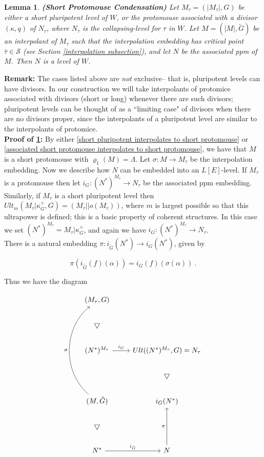 \documentclass[12pt]{article}
\newtheorem{lem}[thm]{Lemma}
\begin{document}
\begin{lem} \label{short protomouse condensation}
\textbf{(Short Protomouse Condensation)}
Let $M_\tau = (| M_\tau | , G)$ be either a short pluripotent level of $W$, or the protomouse associated with a divisor $(\kappa , q)$ of $N_\tau$, where $N_\tau$ is the collapsing-level for $\tau$ in $W$.  Let $M = (|M | , \tilde{G})$ be an interpolant of $M_\tau $ such that the interpolation embedding has critical point $\bar{\tau} \in \mathcal{S}$ (see Section \ref{interpolation subsection}), and let $N$ be the associated ppm of $M$.  Then $N$ is a level of $W$.
\end{lem}

\textbf{Remark:} The cases listed above are \textit{not} exclusive-- that is, pluripotent levels can have divisors.  In our construction we will take interpolants of protomice associated with divisors (short or long) whenever there are such divisors; pluripotent levels can be thought of as a ``limiting case"  of divisors when there are no divisors proper, since the interpolants of a pluripotent level are similar to the interpolants of protomice.\\


\indent \indent \textbf{Proof of \ref{short protomouse condensation}:}  By either \ref{short pluripotent interpolates to short protomouse} or \ref{associated short protomouse interpolates to short protomouse}, we have that $M$ is a short protomouse with $\varrho_{1}(M) = \Lambda$.  Let $\sigma: M \longrightarrow M_\tau$ be the interpolation embedding.  Now we describe how $N$ can be embedded into an $L[E]$-level.  If $M_\tau$ is a protomouse then let $i_G : (N^*)^{M_\tau} \longrightarrow N_\tau$ be the associated ppm embedding.  Similarly, if $M_\tau$ is a short pluripotent level then $Ult_m (M_\tau | \kappa_G^+ , G) = ( M_\tau || o(M_\tau) )$, where $m$ is largest possible so that this ultrapower is defined; this is a basic property of coherent structures.  In this case we set $(N^*)^{M_\tau} = M_\tau | \kappa_G^+$, and again we have $i_G : (N^*)^{M_\tau} \longrightarrow N_\tau$.\\

There is a natural embedding $\pi: i_{\tilde{G}}(N^* ) \longrightarrow i_G ( N^* )$, given by 

\[
\pi ( i_{\tilde{G}} (f) (\alpha)) = i_G (f)(\sigma (\alpha )) \ .
\]

\smallskip

Thus we have the diagram


\[
\begin{tikzcd}
( M_\tau , G ) & \\
\bigtriangledown & \\
(N^*)^{M_\tau} \arrow[r, "i_G"] & Ult ((N^*)^{M_\tau} , G ) = N_\tau \\
& \bigtriangledown \\
( M , \tilde{G} ) \arrow[to=1-1, bend left=50, "\sigma"] & i_{G}(N^* ) \\
\bigtriangledown & \\
N^* \arrow[r, "i_{\tilde{G}}"] & N \arrow[to=5-2 , "\pi"]
\end{tikzcd}
\]
 
\end{document}
